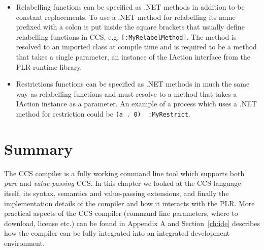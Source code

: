 \begin{itemize}
		\item Relabelling functions can be specified as .NET methods in addition 
		to be constant replacements. To use a .NET method for relabelling its name 
		prefixed with a colon is put inside the square brackets that usually 
		define relabelling functions in CCS, e.g. \texttt{[:MyRelabelMethod]}. The 
		method is resolved to an imported class at compile time and is required to 
		be a method that takes a single parameter, an instance of the 
		\textsf{IAction} interface from the PLR runtime library.
		
		\item Restrictions functions can be specified as .NET methods in much the 
		same way as relabelling functions and must resolve to a method that takes 
		a \textsf{IAction} instance as a parameter. An example of a process which 
		uses a .NET method for restriction could be \texttt{(a . 0) \ :MyRestrict}.

	\end{itemize}
	
\section{Summary}
	The CCS compiler is a fully working command line tool which supports both 
	\textit{pure} and \textit{value-passing} CCS. In this chapter we looked at 
	the CCS language itself, its syntax, semantics and value-passing extensions, 
	and finally the implementation details of the compiler and how it interacts 
	with the PLR.	More practical aspects of the CCS compiler (command line 
	parameters, where to download, license etc.) can be found in Appendix A and 
	Section~\ref{ch:ide} describes how the compiler can be fully integrated into 
	an integrated development environment.